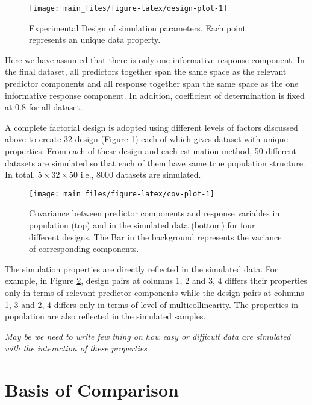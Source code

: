\documentclass[12pt,3p,authoryear]{elsarticle}
\begin{document}
\begin{figure}[!htb]
\texttt{[image: main\_files/figure-latex/design-plot-1]} \caption{Experimental Design of simulation parameters. Each point represents an unique data property.}\label{fig:design-plot}
\end{figure}

Here we have assumed that there is only one informative response
component. In the final dataset, all predictors together span the same
space as the relevant predictor components and all response together
span the same space as the one informative response component. In
addition, coefficient of determination is fixed at 0.8 for all dataset.

A complete factorial design is adopted using different levels of factors
discussed above to create 32 design (Figure \ref{fig:design-plot}) each
of which gives dataset with unique properties. From each of these design
and each estimation method, 50 different datasets are simulated so that
each of them have same true population structure. In total,
\(5 \times 32 \times 50\) i.e., 8000 datasets are simulated.






\begin{figure}
\texttt{[image: main\_files/figure-latex/cov-plot-1]} \caption{Covariance between predictor components and response
variables in population (top) and in the simulated data (bottom) for
four different designs. The Bar in the background represents the
variance of corresponding components.}\label{fig:cov-plot}
\end{figure}

The simulation properties are directly reflected in the simulated data.
For example, in Figure \ref{fig:cov-plot}, design pairs at columns 1, 2
and 3, 4 differs their properties only in terms of relevant predictor
components while the design pairs at columns 1, 3 and 2, 4 differs only
in-terms of level of multicollinearity. The properties in population are
also reflected in the simulated samples.

\emph{\alert{May be we need to write few thing on how easy or difficult data are simulated with the interaction of these properties}}

\section{Basis of Comparison}\label{basis-of-comparison}
\end{document}
